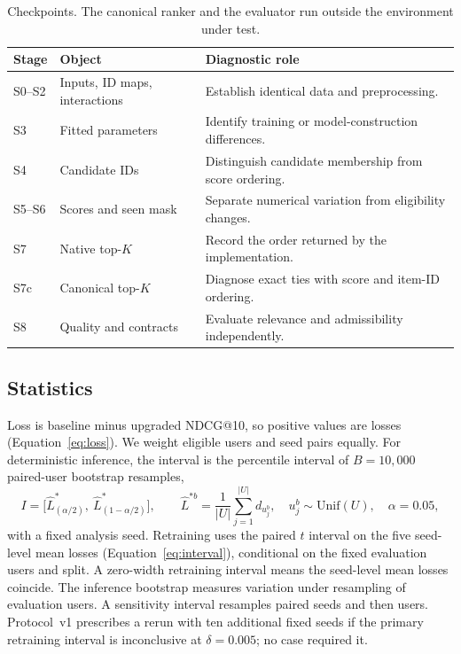 \documentclass[11pt,a4paper]{article}
\begin{document}
\begin{table}[htbp]
  \centering\small
  \caption{Checkpoints. The canonical ranker and the evaluator run outside
    the environment under test.}
  \label{tab:stages}
  \begin{tabularx}{\textwidth}{@{}llX@{}}
    \toprule
    Stage & Object & Diagnostic role \\
    \midrule
    S0--S2 & Inputs, ID maps, interactions & Establish identical data and preprocessing. \\
    S3 & Fitted parameters & Identify training or model-construction differences. \\
    S4 & Candidate IDs & Distinguish candidate membership from score ordering. \\
    S5--S6 & Scores and seen mask & Separate numerical variation from eligibility changes. \\
    S7 & Native top-$K$ & Record the order returned by the implementation. \\
    S7c & Canonical top-$K$ & Diagnose exact ties with score and item-ID ordering. \\
    S8 & Quality and contracts & Evaluate relevance and admissibility independently. \\
    \bottomrule
  \end{tabularx}
\end{table}

\subsection{Statistics}
Loss is baseline minus upgraded NDCG@10, so positive values are losses
(Equation~\ref{eq:loss}). We weight eligible users and seed pairs equally. For
deterministic inference, the interval is the percentile interval of
$B=10{,}000$ paired-user bootstrap resamples,
\begin{equation}
 I=\bigl[\widehat L^{*}_{(\alpha/2)},\ \widehat L^{*}_{(1-\alpha/2)}\bigr],\qquad
 \widehat L^{*b}=\frac{1}{|U|}\sum_{j=1}^{|U|} d_{u^b_j},\quad
 u^b_j\sim\mathrm{Unif}(U),\quad \alpha=0.05,
 \label{eq:bootstrap}
\end{equation}
with a fixed analysis seed. Retraining uses the paired $t$ interval on the
five seed-level mean losses (Equation~\ref{eq:interval}), conditional on the
fixed evaluation users and split. A zero-width retraining interval means the
seed-level mean losses coincide. The inference bootstrap measures variation
under resampling of evaluation users. A sensitivity interval resamples paired
seeds and then users. Protocol~v1 prescribes a rerun
with ten additional fixed seeds if the primary retraining interval is
inconclusive at $\delta=0.005$; no case required it.
\end{document}

